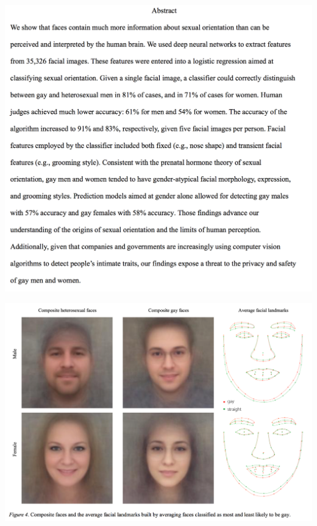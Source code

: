 \begin{frame}
	\begin{center}
		\includegraphics[height=0.8\textheight]{orientation2}
	\end{center}
\end{frame}

\begin{frame}
	\begin{center}
		\includegraphics[width=\textwidth]{orientation3}
	\end{center}
\end{frame}


